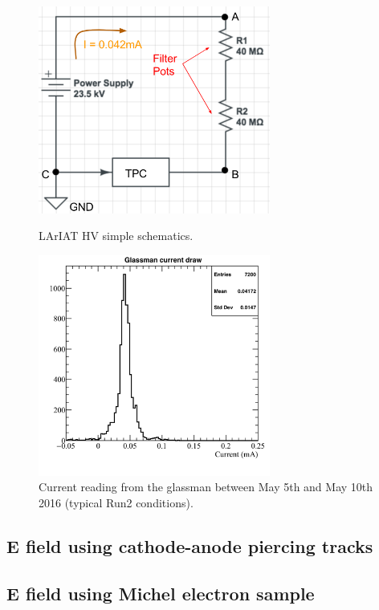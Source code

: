 \begin{figure}[hp]
\centering
\begin{minipage}{0.45\textwidth}
\centering
\includegraphics[width=3in]{images/CircuitLArIAT.png}
\caption{LArIAT HV simple schematics.}
\label{fig:circuit}
\end{minipage}\hfill
\begin{minipage}{0.45\textwidth}
\centering
\includegraphics[width=3in]{images/glassman_current_20160525-30.png}
\caption{Current reading from the glassman between May 5th and May 10th 2016 (typical Run2 conditions).}
\label{fig:currentMeasurement}
\end{minipage}
\end{figure}




\subsection{E field using cathode-anode piercing tracks}\label{sec:CAMethode}
\subsection{E field using Michel electron sample}\label{sec:michelEl}
